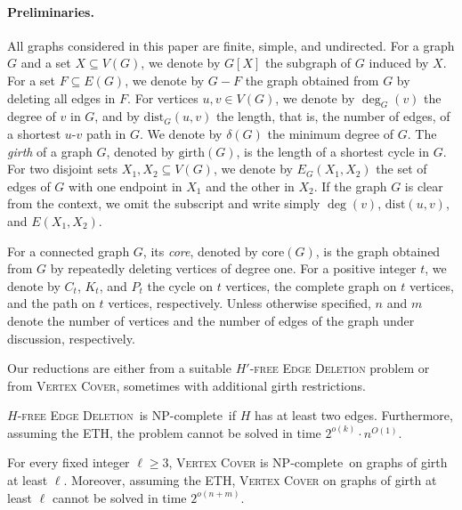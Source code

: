 \documentclass[a4paper,UKenglish,cleveref, autoref, thm-restate]{lipics-v2021}
\newcommand{\pname}[1]{\textnormal{\textsc{#1}}}
\newcommand{\NPC}{NP-complete}
\newcommand{\HFD}{\pname{$H$-free Edge Deletion}}
\newcommand{\girth}{\mathrm{girth}}
\newcommand{\dist}{\mathrm{dist}}
\newcommand{\core}{\mathrm{core}}
\begin{document}

\paragraph*{Preliminaries.}
All graphs considered in this paper are finite, simple, and undirected.
For a graph $G$ and a set $X\subseteq V(G)$, we denote by $G[X]$ the subgraph of $G$ induced by $X$.
For a set $F\subseteq E(G)$, we denote by $G-F$ the graph obtained from $G$ by deleting all edges in $F$.
For vertices $u,v\in V(G)$, we denote by $\deg_G(v)$ the degree of $v$ in $G$, and by $\dist_G(u,v)$ the length, that is, the number of edges, of a shortest $u$-$v$ path in $G$.
We denote by $\delta(G)$ the minimum degree of $G$.
The \emph{girth} of a graph $G$, denoted by $\girth(G)$, is the length of a shortest cycle in $G$.
For two disjoint sets $X_1,X_2\subseteq V(G)$, we denote by $E_G(X_1,X_2)$ the set of edges of $G$ with one endpoint in $X_1$ and the other in $X_2$.
If the graph $G$ is clear from the context, we omit the subscript and write simply $\deg(v)$, $\dist(u,v)$, and $E(X_1,X_2)$.

For a connected graph $G$, its \emph{core}, denoted by $\core(G)$, is the graph obtained from $G$ by repeatedly deleting vertices of degree one.
For a positive integer $t$, we denote by $C_t$, $K_t$, and $P_t$ the cycle on $t$ vertices, the complete graph on $t$ vertices, and the path on $t$ vertices, respectively.
Unless otherwise specified, $n$ and $m$ denote the number of vertices and the number of edges of the graph under discussion, respectively.

Our reductions are either from a suitable \textsc{$H'$-free Edge Deletion} problem or from \textsc{Vertex Cover}, sometimes with additional girth restrictions.

\begin{proposition}
\label{pro:deletion}
\HFD\ is \NPC\ if $H$ has at least two edges.
Furthermore, assuming the ETH, the problem cannot be solved in time
$2^{o(k)}\cdot n^{O(1)}$.
\end{proposition}

\begin{proposition}
\label{pro:vc}
For every fixed integer $\ell\geq 3$, \textsc{Vertex Cover} is \NPC\ on graphs of girth at least $\ell$.
Moreover, assuming the ETH, \textsc{Vertex Cover} on graphs of girth at least $\ell$ cannot be solved in time
$2^{o(n+m)}$.
\end{proposition}
\end{document}

